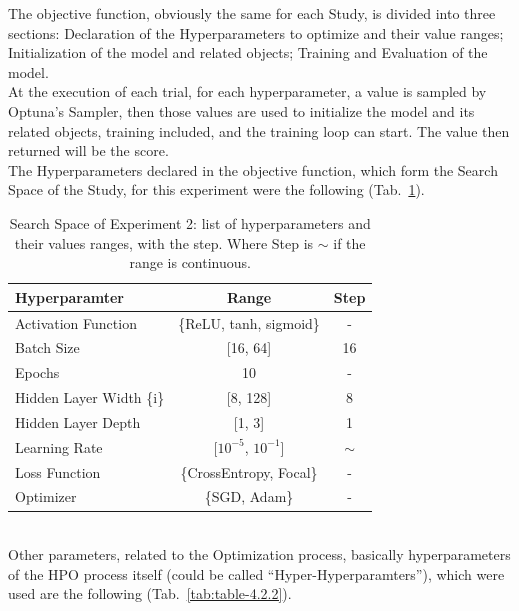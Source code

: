 The objective function, obviously the same for each Study, is divided into three sections: Declaration of the Hyperparameters to optimize and their value ranges; Initialization of the model and related objects; Training and Evaluation of the model.
\\[0.3cm]At the execution of each trial, for each hyperparameter, a value is sampled by Optuna's Sampler, then those values are used to initialize the model and its related objects, training included, and the training loop can start. The value then returned will be the score.
% 
\\[0.3cm]The Hyperparameters declared in the objective function, which form the Search Space of the Study, for this experiment were the following (Tab.~\ref{tab:table-4.2.1}).
\begin{table}[ht!]
	\center
	\setlength{\tabcolsep}{0.5cm}
	\caption[Search Space of Experiment 2]{Search Space of Experiment 2: list of hyperparameters and their values ranges, with the step. Where Step is $\sim$ if the range is continuous.}
	\begin{tabular}{@{}lcc@{}}
		\toprule
		\textbf{Hyperparamter}   & \textbf{Range}             & \textbf{Step} \\ \midrule
		Activation Function      & \{ReLU, tanh, sigmoid\}    & -             \\[0.1cm]
		Batch Size               & {[}16, 64{]}               & 16            \\[0.1cm]
		Epochs                   & 10                         & -             \\[0.1cm]
		Hidden Layer Width \{i\} & {[}8, 128{]}               & 8             \\[0.1cm]
		Hidden Layer Depth       & {[}1, 3{]}                 & 1             \\[0.1cm]
		Learning Rate            & {[}$10^{-5}$, $10^{-1}${]} & $\sim$        \\[0.1cm]
		Loss Function            & \{CrossEntropy, Focal\}    & -             \\[0.1cm]
		Optimizer                & \{SGD, Adam\}              & -             \\ \bottomrule
	\end{tabular}
	\label{tab:table-4.2.1}
\end{table}
% 
\\[0.3cm]Other parameters, related to the Optimization process, basically hyperparameters of the HPO process itself (could be called “Hyper-Hyperparamters”), which were used are the following (Tab.~\ref{tab:table-4.2.2}).
